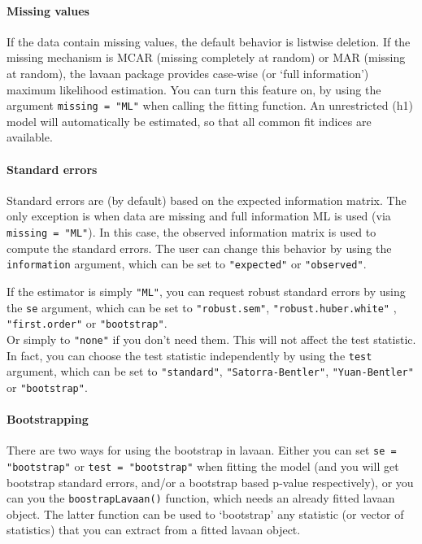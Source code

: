 \paragraph{Missing values}

If the data contain missing values, the default behavior is listwise
deletion. If the missing mechanism is MCAR (missing completely at
random) or MAR (missing at random), the lavaan package provides
case-wise (or `full information') maximum likelihood estimation. You can
turn this feature on, by using the argument \texttt{missing = "ML"} when
calling the fitting function. An unrestricted (h1) model will
automatically be estimated, so that all common fit indices are
available.

\paragraph{Standard errors}

Standard errors are (by default) based on the expected information
matrix. The only exception is when data are missing and full information
ML is used (via \texttt{missing = "ML"}). In this case, the observed
information matrix is used to compute the standard errors. The user can
change this behavior by using the \texttt{information} argument, which
can be set to \texttt{"expected"} or \texttt{"observed"}.

If the estimator is simply \texttt{"ML"}, you can request robust
standard errors by using the \texttt{se} argument, which can be set to
\texttt{"robust.sem"}, \texttt{"robust.huber.white"} ,
\texttt{"first.order"} or \texttt{"bootstrap"}.\\Or simply to
\texttt{"none"} if you don't need them. This will not affect the test
statistic. In fact, you can choose the test statistic independently by
using the \texttt{test} argument, which can be set to
\texttt{"standard"}, \texttt{"Satorra-Bentler"}, \texttt{"Yuan-Bentler"}
or \texttt{"bootstrap"}.

\paragraph{Bootstrapping}

There are two ways for using the bootstrap in lavaan. Either you can set
\texttt{se = "bootstrap"} or \texttt{test = "bootstrap"} when fitting
the model (and you will get bootstrap standard errors, and/or a
bootstrap based p-value respectively), or you can you the
\texttt{boostrapLavaan()} function, which needs an already fitted lavaan
object. The latter function can be used to `bootstrap' any statistic (or
vector of statistics) that you can extract from a fitted lavaan object.
